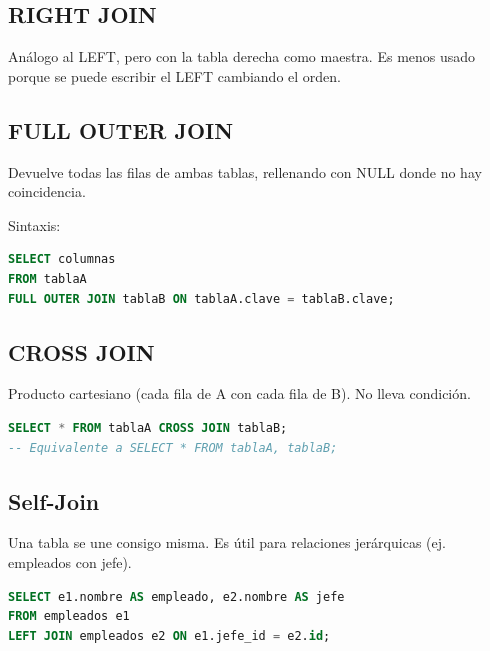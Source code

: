\documentclass[12pt,a4paper,openany,oneside]{book}
\begin{document}
\subsection{RIGHT JOIN}
Análogo al LEFT, pero con la tabla derecha como maestra. Es menos usado porque se puede escribir el LEFT cambiando el orden.

\subsection{FULL OUTER JOIN}
Devuelve todas las filas de ambas tablas, rellenando con NULL donde no hay coincidencia.
\begin{center}
\end{center}
Sintaxis:
\begin{lstlisting}[language=SQL]
SELECT columnas
FROM tablaA
FULL OUTER JOIN tablaB ON tablaA.clave = tablaB.clave;
\end{lstlisting}

\subsection{CROSS JOIN}
Producto cartesiano (cada fila de A con cada fila de B). No lleva condición.
\begin{lstlisting}[language=SQL]
SELECT * FROM tablaA CROSS JOIN tablaB;
-- Equivalente a SELECT * FROM tablaA, tablaB;
\end{lstlisting}

\subsection{Self-Join}
Una tabla se une consigo misma. Es útil para relaciones jerárquicas (ej. empleados con jefe).
\begin{lstlisting}[language=SQL]
SELECT e1.nombre AS empleado, e2.nombre AS jefe
FROM empleados e1
LEFT JOIN empleados e2 ON e1.jefe_id = e2.id;
\end{lstlisting}
\end{document}
